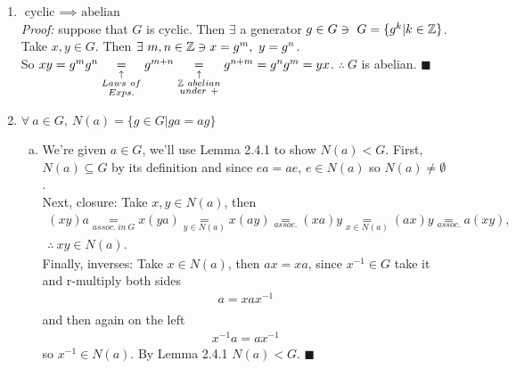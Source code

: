 \begin{enumerate}
\item $\boxed{\text{cyclic }\implies \text{ abelian}}$ \\
\textit{Proof: } suppose that $G$ is cyclic. Then $\exists$ a generator $g\in G \ni \ G=\{g^k | k \in {\mathbb{ Z}}\}$. Take $x,y \in G$. Then $\exists \ m,n \in \Z \ni x=g^m, \ y=g^n$. \\

So $xy = g^m g^n \underset{\substack{\uparrow \\ Laws \ of \\ Exps.}}{=} g^{m+n} \underset{\substack{\uparrow \\ \Z \ abelian \\ under \ +}}{=} g^{n+m} = g^ng^m = yx$. $\therefore \ G$ is abelian. $\blacksquare$ 

\item $\forall \ a \in G, \ N(a) = \{g \in G | ga = ag \} $
\begin{enumerate}[a)]
    \item We're given $a\in G$, we'll use Lemma 2.4.1 to show $N(a)<G$.
    First, $N(a) \subseteq G$ by its definition and since $ea = ae$, $e\in N(a)$ so $N(a)\neq \emptyset$. \\
    Next, closure: Take $x,y \in N(a)$, then
    \begin{align*}
        (xy)a \underset{assoc. \ in \ G}{=} x(ya) \underset{y\in N(a)}{=} x(ay) \underset{assoc.}{=} (xa)y \underset{x\in N(a)}{=} (ax)y \underset{assoc.}{=}a(xy), \\ 
        \therefore \ xy \in N(a).
    \end{align*}
    Finally, inverses: Take $x\in N(a)$, then $ax=xa$, since $x^{-1} \in G$ take it and r-multiply both sides
    \begin{align*}
        a = xax^{-1} \\
    \end{align*}
    and then again on the left
    \begin{align*}
        x^{-1}a= ax^{-1}
    \end{align*}
    so $x^{-1}\in N(a)$. By Lemma 2.4.1 $N(a)<G$. $\blacksquare$


\end{enumerate}
\end{enumerate}
